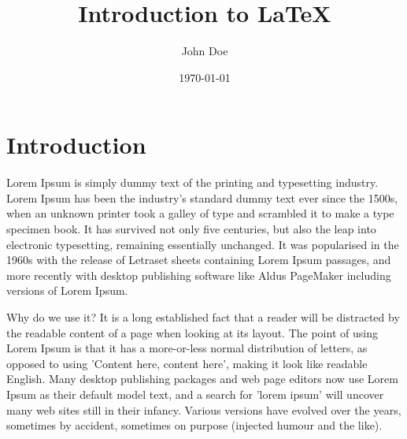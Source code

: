 \documentclass[12pt, a4paper]{article}
\title{Introduction to {\LaTeX}}
\author{John Doe}
\date{\today}
\begin{document}
	\maketitle 

\section{Introduction}
Lorem Ipsum is simply dummy text of the printing and typesetting industry. 
Lorem Ipsum has been the industry's standard dummy text ever since the 1500s, 
when an unknown printer took a galley of type and scrambled it to make a type 
specimen book. It has survived not only five centuries, but also the leap into 
electronic typesetting, remaining essentially unchanged. It was popularised in 
the 1960s with the release of Letraset sheets containing Lorem Ipsum passages, 
and more recently with desktop publishing software like Aldus PageMaker 
including versions of Lorem Ipsum.

Why do we use it?
It is a long established fact that a reader will be distracted by the readable 
content of a page when looking at its layout. The point of using Lorem Ipsum is 
that it has a more-or-less normal distribution of letters, as opposed to using 
'Content here, content here', making it look like readable English. Many 
desktop publishing packages and web page editors now use Lorem Ipsum as their 
default model text, and a search for 'lorem ipsum' will uncover many web sites 
still in their infancy. Various versions have evolved over the years, sometimes 
by accident, sometimes on purpose (injected humour and the like).

	
\end{document}
